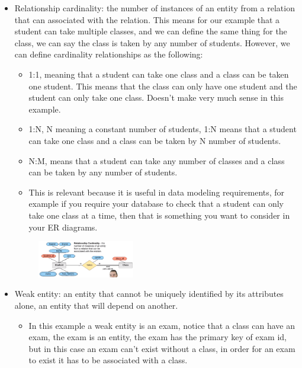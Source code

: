 \begin{itemize}
\begin{figure}[H]
        \end{figure}
    \item Relationship cardinality: the number of instances of an entity from a relation that can associated with the relation. This means for our example that a student can take multiple classes, and we can define the same thing for the class, we can say the class is taken by any number of students. However, we can define cardinality relationships as the following:
        \begin{itemize}
            \item 1:1, meaning that a student can take one class and a class can be taken one student. This means that the class can only have one student and the student can only take one class. Doesn't make very much sense in this example.
            \item 1:N, N meaning a constant number of students, 1:N means that a student can take one class and a class can be taken by N number of students.
            \item N:M, means that a student can take any number of classes and a class can be taken by any number of students.
            \item This is relevant because it is useful in data modeling requirements, for example if you require your database to check that a student can only take one class at a time, then that is something you want to consider in your ER diagrams.
        \end{itemize}
        \begin{figure}[H]
            \centering
            \includegraphics[width=0.4\textwidth]{./Figs/2020-12-23-23-52-17.png}
        \end{figure}
    \item Weak entity: an entity that cannot be uniquely identified by its attributes alone, an entity that will depend on another.
        \begin{itemize}
            \item In this example a weak entity is an exam, notice that a class can have an exam, the exam is an entity, the exam has the primary key of exam id, but in this case an exam can't exist without a class, in order for an exam to exist it has to be associated with a class.

\end{itemize}
\end{itemize}
